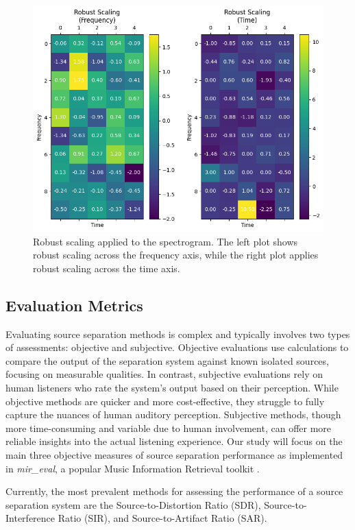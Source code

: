 \documentclass[conference]{IEEEtran}
\begin{document}
\begin{figure}[!htb]
\centering
\includegraphics[width=\linewidth]{robust_scaling.png}
\caption{Robust scaling applied to the spectrogram. The left plot shows robust scaling across the frequency axis, while the right plot applies robust scaling across the time axis.}
\label{fig:robust_scaling}
\end{figure}

\subsection{Evaluation Metrics}

Evaluating source separation methods is complex and typically involves two types of assessments: objective and subjective. Objective evaluations use calculations to compare the output of the separation system against known isolated sources, focusing on measurable qualities. In contrast, subjective evaluations rely on human listeners who rate the system's output based on their perception. While objective methods are quicker and more cost-effective, they struggle to fully capture the nuances of human auditory perception. Subjective methods, though more time-consuming and variable due to human involvement, can offer more reliable insights into the actual listening experience. Our study will focus on the main three objective measures of source separation performance as implemented in \textit{mir\_eval}, a popular Music Information Retrieval toolkit \cite{mir_eval}.

Currently, the most prevalent methods for assessing the performance of a source separation system are the Source-to-Distortion Ratio (SDR), Source-to-Interference Ratio (SIR), and Source-to-Artifact Ratio (SAR).
\end{document}
